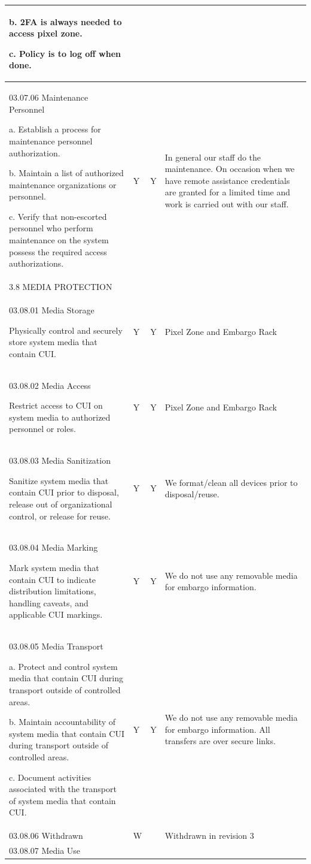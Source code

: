 \begin{longtable} {|p{}|p{}|p{}|p{} |}
{b. 2FA is always needed to access pixel zone.

c. Policy is to log off when done.} \\ \hline
{03.07.06 Maintenance Personnel

a. Establish a process for maintenance personnel authorization.

b. Maintain a list of authorized maintenance organizations or personnel.

c. Verify that non-escorted personnel who perform maintenance on the system possess the required access authorizations.}&{Y}&{Y}&{In general our staff do the maintenance.
On occasion when we have remote assistance credentials are granted for a limited time and work is carried out with our staff. } \\ \hline
{3.8 MEDIA PROTECTION}&&& \\ \hline
{03.08.01 Media Storage

Physically control and securely store system media that contain CUI.}&{Y}&{Y}&{Pixel Zone and Embargo Rack} \\ \hline
{03.08.02 Media Access

Restrict access to CUI on system media to authorized personnel or roles.}&{Y}&{Y}&{Pixel Zone and Embargo Rack} \\ \hline
{03.08.03 Media Sanitization

Sanitize system media that contain CUI prior to disposal, release out of organizational control, or release for reuse.}&{Y}&{Y}&{We format/clean all devices prior to disposal/reuse.} \\ \hline
{03.08.04 Media Marking

Mark system media that contain CUI to indicate distribution limitations, handling
caveats, and applicable CUI markings.}&{Y}&{Y}&{We do not use any removable media for embargo information.} \\ \hline
{03.08.05 Media Transport

a. Protect and control system media that contain CUI during transport outside of controlled areas.

b. Maintain accountability of system media that contain CUI during transport outside of controlled areas.

c. Document activities associated with the transport of system media that contain CUI.}&{Y}&{Y}&{We do not use any removable media for embargo information. All transfers are over secure links.} \\ \hline
{03.08.06 Withdrawn}&{W}&{}&{Withdrawn in revision 3} \\ \hline
{03.08.07 Media Use

}
\end{longtable}
